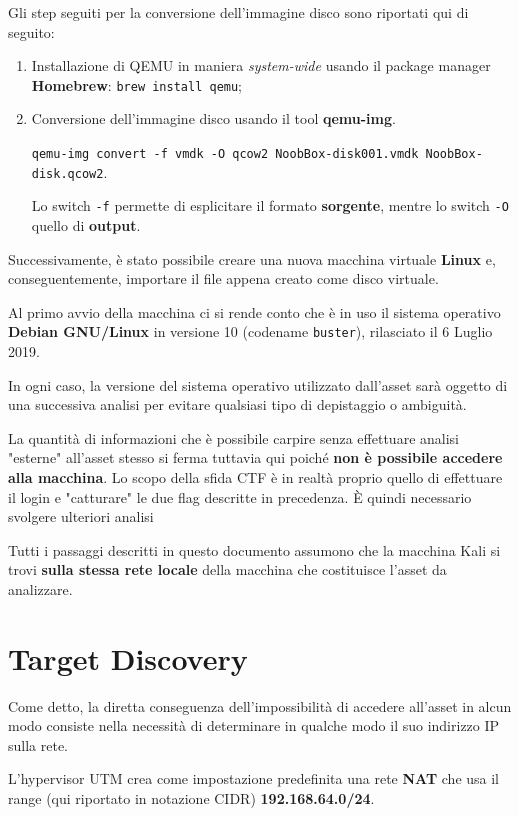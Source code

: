\documentclass[a4paper, 12pt, oneside]{article}
\begin{document}
Gli step seguiti per la conversione dell'immagine disco sono riportati qui di seguito:

\begin{enumerate}
    \item Installazione di QEMU in maniera \textit{system-wide} usando il package manager \textbf{Homebrew}: \verb|brew install qemu|;
    \item Conversione dell'immagine disco usando il tool \textbf{qemu-img}.
    \begin{center}
        \verb|qemu-img convert -f vmdk -O qcow2 NoobBox-disk001.vmdk NoobBox-disk.qcow2|.
    \end{center}
    Lo switch \texttt{-f} permette di esplicitare il formato \textbf{sorgente}, mentre lo switch \texttt{-O} quello di \textbf{output}.
\end{enumerate}

Successivamente, è stato possibile creare una nuova macchina virtuale \textbf{Linux} e, conseguentemente, importare il file appena creato come disco virtuale.

Al primo avvio della macchina ci si rende conto che è in uso il sistema operativo \textbf{Debian GNU\slash Linux} in versione 10 (codename \texttt{buster}), rilasciato il 6 Luglio 2019. \cite{debian}

In ogni caso, la versione del sistema operativo utilizzato dall'asset sarà oggetto di una successiva analisi per evitare qualsiasi tipo di depistaggio o ambiguità.

La quantità di informazioni che è possibile carpire senza effettuare analisi "esterne" all'asset stesso si ferma tuttavia qui poiché \textbf{non è possibile accedere alla macchina}. Lo scopo della sfida CTF è in realtà proprio quello di effettuare il login e "catturare" le due flag descritte in precedenza. È quindi necessario svolgere ulteriori analisi

Tutti i passaggi descritti in questo documento assumono che la macchina Kali si trovi \textbf{sulla stessa rete locale} della macchina che costituisce l'asset da analizzare.

\section{Target Discovery}
Come detto, la diretta conseguenza dell'impossibilità di accedere all'asset in alcun modo consiste nella necessità di determinare in qualche modo il suo indirizzo IP sulla rete.

L'hypervisor UTM crea come impostazione predefinita una rete \textbf{NAT} che usa il range (qui riportato in notazione CIDR) \textbf{192.168.64.0\slash24}.
\end{document}
